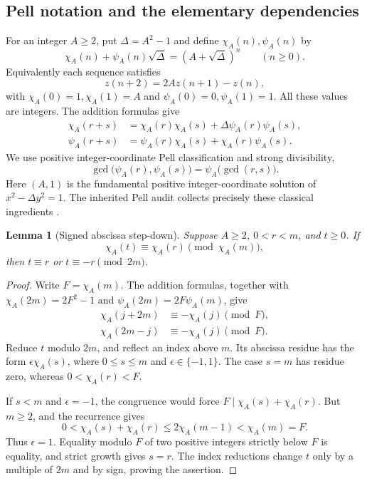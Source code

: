 \documentclass[11pt,a4paper]{article}
\newtheorem{lemma}[theorem]{Lemma}
\theoremstyle{definition}
\begin{document}
\subsection{Pell notation and the elementary dependencies}

For an integer \(A\ge2\), put \(\Delta=A^2-1\) and define
\(\chi_A(n),\psi_A(n)\) by
\[
 \chi_A(n)+\psi_A(n)\sqrt{\Delta}
       =(A+\sqrt{\Delta})^n\qquad(n\ge0).
\]
Equivalently each sequence satisfies
\[
 z(n+2)=2Az(n+1)-z(n),
\]
with \(\chi_A(0)=1,\chi_A(1)=A\) and
\(\psi_A(0)=0,\psi_A(1)=1\).  All these values are integers.  The
addition formulas give
\begin{align*}
 \chi_A(r+s)&=\chi_A(r)\chi_A(s)
                 +\Delta\psi_A(r)\psi_A(s),\\
 \psi_A(r+s)&=\psi_A(r)\chi_A(s)
                 +\chi_A(r)\psi_A(s).
\end{align*}
We use positive integer-coordinate Pell classification and strong
divisibility,
\begin{equation}
 \gcd\bigl(\psi_A(r),\psi_A(s)\bigr)
       =\psi_A\bigl(\gcd(r,s)\bigr).
 \label{eq:strong-divisibility}
\end{equation}
Here \((A,1)\) is the fundamental positive integer-coordinate solution
of \(x^2-\Delta y^2=1\).  The inherited Pell audit collects precisely
these classical ingredients \cite{pell-audit}.

\begin{lemma}[Signed abscissa step-down]
\label{lem:stepdown}
Suppose \(A\ge2\), \(0<r<m\), and \(t\ge0\).  If
\[
 \chi_A(t)\equiv\chi_A(r)\pmod{\chi_A(m)},
\]
then \(t\equiv r\) or \(t\equiv-r\pmod{2m}\).
\end{lemma}

\begin{proof}
Write \(F=\chi_A(m)\).  The addition formulas, together with
\(\chi_A(2m)=2F^2-1\) and
\(\psi_A(2m)=2F\psi_A(m)\), give
\begin{align*}
 \chi_A(j+2m)&\equiv-\chi_A(j)\pmod F,\\
 \chi_A(2m-j)&\equiv-\chi_A(j)\pmod F.
\end{align*}
Reduce \(t\) modulo \(2m\), and reflect an index above \(m\).  Its
abscissa residue has the form
\(\epsilon\chi_A(s)\), where \(0\le s\le m\) and
\(\epsilon\in\{-1,1\}\).
The case \(s=m\) has residue zero, whereas
\(0<\chi_A(r)<F\).

If \(s<m\) and \(\epsilon=-1\), the congruence would force
\(F\mid\chi_A(s)+\chi_A(r)\).  But \(m\ge2\), and the recurrence gives
\[
 0<\chi_A(s)+\chi_A(r)
       \le2\chi_A(m-1)<\chi_A(m)=F.
\]
Thus \(\epsilon=1\).  Equality modulo \(F\) of two positive integers
strictly below \(F\) is equality, and strict growth gives \(s=r\).
The index reductions change \(t\) only by a multiple of \(2m\) and by
sign, proving the assertion.
\end{proof}
\end{document}
